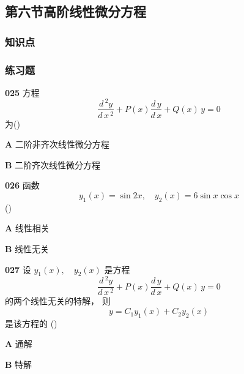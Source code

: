 \documentclass[a4paper,10pt]{article} %
\begin{document}


\textheight


\newpage
\subsection{第六节\quad 高阶线性微分方程}
\subsubsection{知识点}
\subsubsection{练习题}
\par\noindent \textbf{025} \quad 方程
$$\frac{d\,^2y}{d\,x\,^2}+P(x)\frac{d\,y}{d\,x}+Q(x)\,y=0$$
为\hfill (\quad\quad\quad)
\par\noindent \textbf{A} \quad 二阶非齐次线性微分方程
\par\noindent \textbf{B} \quad 二阶齐次线性微分方程





\textheight


\par\noindent \textbf{026} \quad 函数
$$y_1(x)=\sin 2x, \quad y_2(x)=6\sin x\cos x$$
\hfill (\quad\quad\quad)
\par\noindent \textbf{A} \quad 线性相关
\par\noindent \textbf{B} \quad 线性无关





\textheight


\par\noindent \textbf{027} \quad 设
$y_1(x), \quad y_2(x)$
是方程
$$\frac{d\,^2y}{d\,x\,^2}+P(x)\frac{d\,y}{d\,x}+Q(x)\,y=0$$
的两个线性无关的特解， 则
$$y=C_1y_1(x)+C_2y_2(x)$$
是该方程的
\hfill (\quad\quad\quad)
\par\noindent \textbf{A} \quad 通解
\par\noindent \textbf{B} \quad 特解



\end{document}
